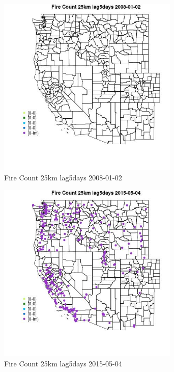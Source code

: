 \begin{figure} 
\centering  
\includegraphics[width=0.77\textwidth]{Code_Outputs/Report_ML_input_PM25_Step4_part_e_de_duplicated_aves_compiled_2019-05-18wNAs_MapObsFire_Count_25km_lag5days2008-01-02.jpg} 
\caption{\label{fig:Report_ML_input_PM25_Step4_part_e_de_duplicated_aves_compiled_2019-05-18wNAsMapObsFire_Count_25km_lag5days2008-01-02}Fire Count 25km lag5days 2008-01-02} 
\end{figure} 
 

\clearpage 

\begin{figure} 
\centering  
\includegraphics[width=0.77\textwidth]{Code_Outputs/Report_ML_input_PM25_Step4_part_e_de_duplicated_aves_compiled_2019-05-18wNAs_MapObsFire_Count_25km_lag5days2015-05-04.jpg} 
\caption{\label{fig:Report_ML_input_PM25_Step4_part_e_de_duplicated_aves_compiled_2019-05-18wNAsMapObsFire_Count_25km_lag5days2015-05-04}Fire Count 25km lag5days 2015-05-04} 
\end{figure} 
 

